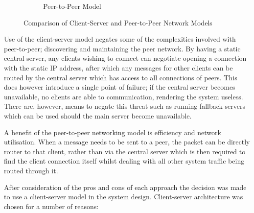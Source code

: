 \begin{figure}[!htbp]
\begin{subfigure}[b]{0.4\textwidth}
		\caption{Peer-to-Peer Model}
		\label{subfig:peer-to-peer}
	\end{subfigure}
	\caption{Comparison of Client-Server and Peer-to-Peer Network Models}
	\label{fig:network_models}
\end{figure}

Use of the client-server model negates some of the complexities involved with peer-to-peer; discovering and maintaining the peer network.  By having a static central server, any clients wishing to connect can negotiate opening a connection with the static IP address, after which any messages for other clients can be routed by the central server which has access to all connections of peers.  This does however introduce a single point of failure;  if the central server becomes unavailable, no clients are able to communication, rendering the system useless.  There are, however, means to negate this threat such as running fallback servers which can be used should the main server become unavailable.

A benefit of the peer-to-peer networking model is efficiency and network utilisation.  When a message needs to be sent to a peer, the packet can be directly router to that client, rather than via the central server which is then required to find the client connection itself whilst dealing with all other system traffic being routed through it.

After consideration of the pros and cons of each approach the decision was made to use a client-server model in the system design.  Client-server architecture was chosen for a number of reasons:

